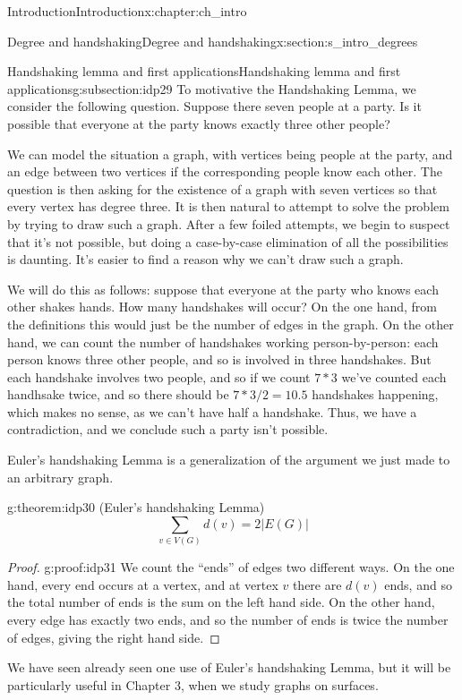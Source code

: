 \documentclass[oneside,10pt,]{book}
\numberwithin{equation}{section}
\begin{document}
\begin{chapterptx}{Introduction}{}{Introduction}{}{}{x:chapter:ch_intro}
\begin{sectionptx}{Degree and handshaking}{}{Degree and handshaking}{}{}{x:section:s_intro_degrees}
\begin{subsectionptx}{Handshaking lemma and first applications}{}{Handshaking lemma and first applications}{}{}{g:subsection:idp29}
To motivative the Handshaking Lemma, we consider the following question.  Suppose there seven people at a party.  Is it possible that everyone at the party knows exactly three other people?%
\par
We can model the situation a graph, with vertices being people at the party, and an edge between two vertices if the corresponding people know each other.  The question is then asking for the existence of a graph with seven vertices so that every vertex has degree three.  It is then natural to attempt to solve the problem by trying to draw such a graph.  After a few foiled attempts, we begin to suspect that it's not possible, but doing a case-by-case elimination of all the possibilities is daunting.  It's easier to find a reason why we can't draw such a graph.%
\par
We will do this as follows: suppose that everyone at the party who knows each other shakes hands.  How many handshakes will occur?  On the one hand, from the definitions this would just be the number of edges in the graph.  On the other hand, we can count the number of handshakes working person-by-person: each person knows three other people, and so is involved in three handshakes.  But each handshake involves two people, and so if we count \(7*3\) we've counted each handhsake twice, and so there should be \(7*3/2=10.5\) handshakes happening, which makes no sense, as we can't have half a handshake.  Thus, we have a contradiction, and we conclude such a party isn't possible.%
\par
Euler's handshaking Lemma is a generalization of the argument we just made to an arbitrary graph.%
\begin{theorem}{}{}{g:theorem:idp30}%
(Euler's handshaking Lemma)%
%
\begin{equation*}
\sum_{v\in V(G)}d(v)=2|E(G)|
\end{equation*}
\end{theorem}
\begin{proof}{}{g:proof:idp31}
We count the ``ends'' of edges two different ways.  On the one hand, every end occurs at a vertex, and at vertex \(v\) there are \(d(v)\) ends, and so the total number of ends is the sum on the left hand side. On the other hand, every edge has exactly two ends, and so the number of ends is twice the number of edges, giving the right hand side.%
\end{proof}
We have seen already seen one use of Euler's handshaking Lemma, but it will be particularly useful in Chapter 3, when we study graphs on surfaces.%

\end{subsectionptx}
\end{sectionptx}
\end{chapterptx}
\end{document}
